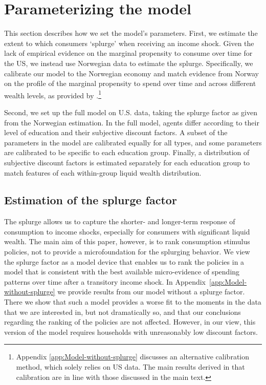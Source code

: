 \documentclass[\PathToRoot/\ProjectName]{subfiles}
\begin{document}
\section{Parameterizing the model}
\whenintegrated{\label{sec:parameters}}

This section describes how we set the model's parameters. First, we estimate the extent to which consumers `splurge' when receiving an income shock. Given the lack of empirical evidence on the marginal propensity to consume over time for the US, we instead use Norwegian data to estimate the splurge. Specifically, we calibrate our model to the Norwegian economy and match evidence from Norway on the profile of the marginal propensity to spend over time and across different wealth levels, as provided by \cite{fagereng-mpc-2021}.\footnote{Appendix \ref{app:Model-without-splurge} discusses an alternative calibration method, which solely relies on US data. The main results derived in that calibration are in line with those discussed in the main text.}

Second, we set up the full model on U.S. data, taking the splurge factor as given from the Norwegian estimation. In the full model, agents differ according to their level of education and their subjective discount factors. A subset of the parameters in the model are calibrated equally for all types, and some parameters are calibrated to be specific to each education group. Finally, a distribution of subjective discount factors is estimated separately for each education group to match features of each within-group liquid wealth distribution.

\subsection{Estimation of the splurge factor}
\whenintegrated{\label{sec:splurge}}

The splurge allows us to capture the shorter- and longer-term response of consumption to income shocks, especially for consumers with significant liquid wealth. The main aim of this paper, however, is to rank consumption stimulus policies, not to provide a microfoundation for the splurging behavior. We view the splurge factor as a model device that enables us to rank the policies in a model that is consistent with the best available micro-evidence of spending patterns over time after a transitory income shock. In Appendix~\ref{app:Model-without-splurge} we provide results from our model without a splurge factor. There we show that such a model provides a worse fit to the moments in the data that we are interested in, but not dramatically so, and that our conclusions regarding the ranking of the policies are not affected. However, in our view, this version of the model requires households with unreasonably low discount factors.
\end{document}
